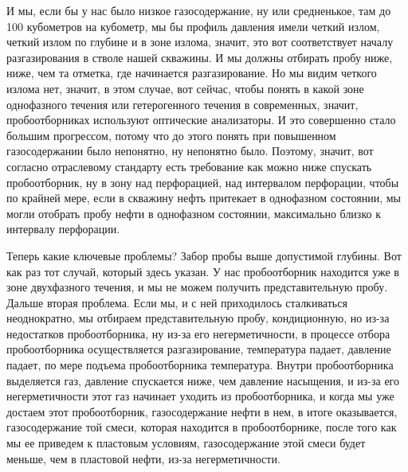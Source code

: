 \documentclass[main.tex]{subfiles}
\begin{document}
И мы, если бы у нас было низкое газосодержание, ну или средненькое, там до 100 кубометров на кубометр, мы бы профиль давления имели четкий излом, четкий излом по глубине и в зоне излома, значит, это вот соответствует началу разгазирования в стволе нашей скважины.
И мы должны отбирать пробу ниже, ниже, чем та отметка, где начинается разгазирование.
Но мы видим четкого излома нет, значит, в этом случае, вот сейчас, чтобы понять в какой зоне однофазного течения или гетерогенного течения в современных, значит, пробоотборниках используют оптические анализаторы.
И это совершенно стало большим прогрессом, потому что до этого понять при повышенном газосодержании было непонятно, ну непонятно было.
Поэтому, значит, вот согласно отраслевому стандарту есть требование как можно ниже спускать пробоотборник, ну в зону над перфорацией, над интервалом перфорации, чтобы по крайней мере, если в скважину нефть притекает в однофазном состоянии, мы могли отобрать пробу нефти в однофазном состоянии, максимально близко к интервалу перфорации.

Теперь какие ключевые проблемы?
Забор пробы выше допустимой глубины.
Вот как раз тот случай, который здесь указан.
У нас пробоотборник находится уже в зоне двухфазного течения, и мы не можем получить представительную пробу.
Дальше вторая проблема.
Если мы, и с ней приходилось сталкиваться неоднократно, мы отбираем представительную пробу, кондиционную, но из-за недостатков пробоотборника, ну из-за его негерметичности, в процессе отбора пробоотборника осуществляется разгазирование, температура падает, давление падает, по мере подъема пробоотборника температура.
Внутри пробоотборника выделяется газ, давление спускается ниже, чем давление насыщения, и из-за его негерметичности этот газ начинает уходить из пробоотборника, и когда мы уже достаем этот пробоотборник, газосодержание нефти в нем, в итоге оказывается, газосодержание той смеси, которая находится в пробоотборнике, после того как мы ее приведем к пластовым условиям, газосодержание этой смеси будет меньше, чем в пластовой нефти, из-за негерметичности.
\end{document}

